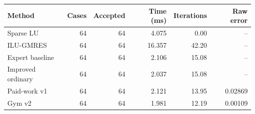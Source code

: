 \begin{tabular}{lrrrrr}
\toprule Method & Cases & Accepted & Time (ms) & Iterations & Raw error \\
\midrule
Sparse LU & 64 & 64 & 4.075 & 0.00 & -- \\
ILU-GMRES & 64 & 64 & 16.357 & 42.20 & -- \\
Expert baseline & 64 & 64 & 2.106 & 15.08 & -- \\
Improved ordinary & 64 & 64 & 2.037 & 15.08 & -- \\
Paid-work v1 & 64 & 64 & 2.121 & 13.95 & 0.02869 \\
Gym v2 & 64 & 64 & 1.981 & 12.19 & 0.00109 \\
\bottomrule
\end{tabular}
